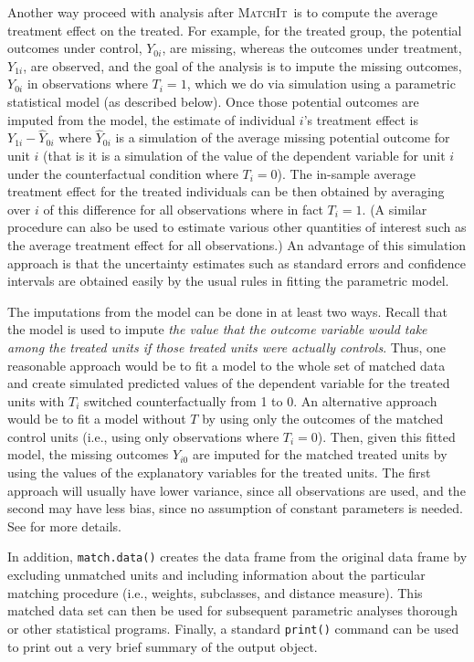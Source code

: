 \documentclass[oneside,letterpaper,titlepage]{article}
\newcommand{\hlink}{\htmladdnormallink}
\newcommand{\MatchIt}{\textsc{MatchIt}}
\begin{document}
Another way proceed with analysis after \MatchIt\ is to compute the
average treatment effect on the treated.  For example, for the treated
group, the potential outcomes under control, $Y_{0i}$, are missing,
whereas the outcomes under treatment, $Y_{1i}$, are observed, and the
goal of the analysis is to impute the missing outcomes, $Y_{0i}$ in
observations where $T_i=1$, which we do via simulation using a
parametric statistical model (as described below).  Once those
potential outcomes are imputed from the model, the estimate of
individual $i$'s treatment effect is $Y_{1i}-\widehat{Y}_{0i}$ where
$\widehat{Y}_{0i}$ is a simulation of the average missing potential
outcome for unit $i$ (that is it is a simulation of the value of the
dependent variable for unit $i$ under the counterfactual condition
where $T_i=0$).  The in-sample average treatment effect for the
treated individuals can be then obtained by averaging over $i$ of this
difference for all observations where in fact $T_i=1$.  (A similar
procedure can also be used to estimate various other quantities of
interest such as the average treatment effect for all observations.)
An advantage of this simulation approach is that the uncertainty
estimates such as standard errors and confidence intervals are
obtained easily by the usual rules in fitting the parametric model.

The imputations from the model can be done in at least two ways.
Recall that the model is used to impute \emph{the value that the
  outcome variable would take among the treated units if those treated
  units were actually controls}.  Thus, one reasonable approach would
be to fit a model to the whole set of matched data and create
simulated predicted values of the dependent variable for the treated
units with $T_i$ switched counterfactually from 1 to 0.  An
alternative approach would be to fit a model without $T$ by using only
the outcomes of the matched control units (i.e., using only
observations where $T_i=0$).  Then, given this fitted model, the
missing outcomes $Y_{i0}$ are imputed for the matched treated units by
using the values of the explanatory variables for the treated units.
The first approach will usually have lower variance, since all
observations are used, and the second may have less bias, since no
assumption of constant parameters is needed.  See \citep{HoImaKin05}
for more details.





In addition, \texttt{match.data()} creates the data frame from the
original data frame by excluding unmatched units and including
information about the particular matching procedure (i.e., weights,
subclasses, and distance measure).  This matched data set can then be
used for subsequent parametric analyses thorough
\hlink{Zelig}{http://gking.harvard.edu/zelig/} or other statistical
programs. Finally, a standard \texttt{print()} command can be used to
print out a very brief summary of the output object.
\end{document}

